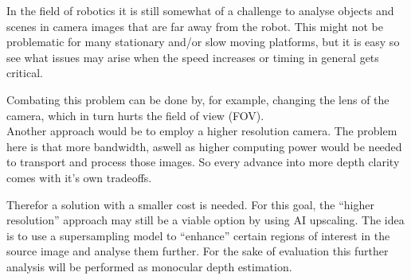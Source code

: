 In the field of robotics it is still somewhat of a challenge to analyse objects and scenes in camera images that are far away from the robot.
This might not be problematic for many stationary and/or slow moving platforms, but it is easy so see what issues may arise when the speed increases or timing in general gets critical.

Combating this problem can be done by, for example, changing the lens of the camera, which in turn hurts the field of view (FOV). \\
Another approach would be to employ a higher resolution camera. The problem here is that more bandwidth, aswell as higher computing power would be needed to transport and process those images.
So every advance into more depth clarity comes with it's own tradeoffs.

Therefor a solution with a smaller cost is needed. For this goal, the \enquote{higher resolution} approach may still be a viable option by using AI upscaling.
The idea is to use a supersampling model to \enquote{enhance} certain regions of interest in the source image and analyse them further.
For the sake of evaluation this further analysis will be performed as monocular depth estimation.


